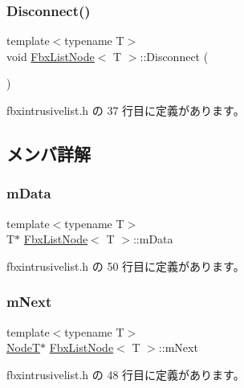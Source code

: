 \subsubsection{\texorpdfstring{Disconnect()}{Disconnect()}}
{\footnotesize\ttfamily template$<$typename T$>$ \\
void \hyperlink{class_fbx_list_node}{Fbx\+List\+Node}$<$ T $>$\+::Disconnect (\begin{DoxyParamCaption}{ }\end{DoxyParamCaption})\hspace{0.3cm}{\ttfamily [inline]}}



 fbxintrusivelist.\+h の 37 行目に定義があります。



\subsection{メンバ詳解}
\mbox{\label{class_fbx_list_node_a4cf8e0064fee22cafa5a3a8330777c57}} 
\subsubsection{\texorpdfstring{m\+Data}{mData}}
{\footnotesize\ttfamily template$<$typename T$>$ \\
T$\ast$ \hyperlink{class_fbx_list_node}{Fbx\+List\+Node}$<$ T $>$\+::m\+Data}



 fbxintrusivelist.\+h の 50 行目に定義があります。

\mbox{\label{class_fbx_list_node_ab2222766332e5adf83e11f3837258193}} 
\subsubsection{\texorpdfstring{m\+Next}{mNext}}
{\footnotesize\ttfamily template$<$typename T$>$ \\
\hyperlink{class_fbx_list_node}{NodeT}$\ast$ \hyperlink{class_fbx_list_node}{Fbx\+List\+Node}$<$ T $>$\+::m\+Next}



 fbxintrusivelist.\+h の 48 行目に定義があります。

